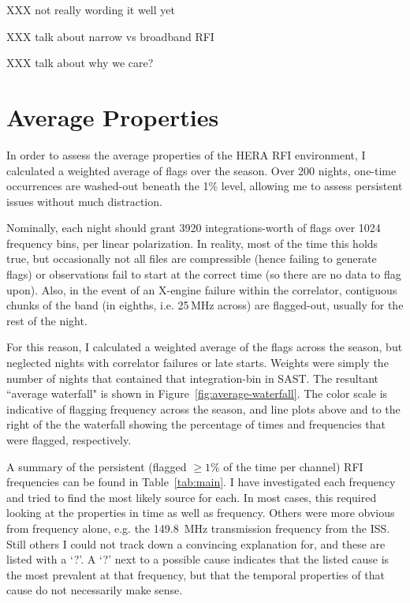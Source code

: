 \documentclass[10pt,a4paper]{article}
\begin{document}
XXX not really wording it well yet

XXX talk about narrow vs broadband RFI

XXX talk about why we care?

\section{Average Properties}

In order to assess the average properties of the HERA RFI environment, I calculated a weighted average of flags over the season. Over 200 nights, one-time occurrences are washed-out beneath the 1\% level, allowing me to assess persistent issues without much distraction. 

Nominally, each night should grant 3920 integrations-worth of flags over 1024 frequency bins, per linear polarization. In reality, most of the time this holds true, but occasionally not all files are compressible (hence failing to generate flags) or observations fail to start at the correct time (so there are no data to flag upon). Also, in the event of an X-engine failure within the correlator, contiguous chunks of the band (in eighths, i.e. 25\,MHz across) are flagged-out, usually for the rest of the night.

For this reason, I calculated a weighted average of the flags across the season, but neglected nights with correlator failures or late starts. Weights were simply the number of nights that contained that integration-bin in SAST. The resultant ``average waterfall" is shown in Figure~\ref{fig:average-waterfall}. The color scale is indicative of flagging frequency across the season, and line plots above and to the right of the the waterfall showing the percentage of times and frequencies that were flagged, respectively. 

A summary of the persistent (flagged $\geq1\%$ of the time per channel) RFI frequencies can be found in Table~\ref{tab:main}. I have investigated each frequency and tried to find the most likely source for each. In most cases, this required looking at the properties in time as well as frequency. Others were more obvious from frequency alone, e.g. the 149.8\, MHz transmission frequency from the ISS. Still others I could not track down a convincing explanation for, and these are listed with a `?'. A `?' next to a possible cause indicates that the listed cause is the most prevalent at that frequency, but that the temporal properties of that cause do not necessarily make sense. 
\end{document}
